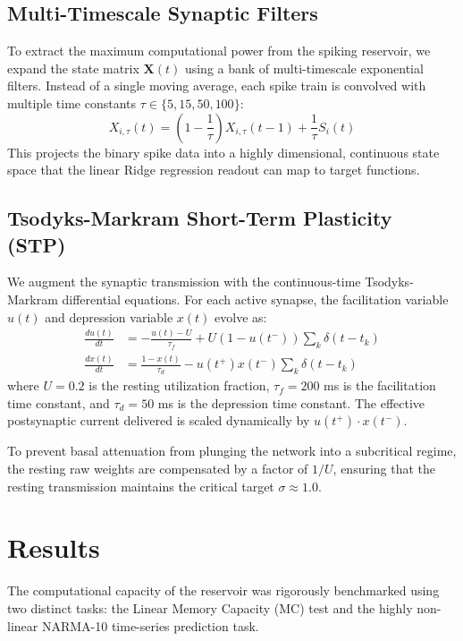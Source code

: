 \documentclass[12pt, a4paper]{article}
\begin{document}
\subsection{Multi-Timescale Synaptic Filters}
To extract the maximum computational power from the spiking reservoir, we expand the state matrix $\mathbf{X}(t)$ using a bank of multi-timescale exponential filters. Instead of a single moving average, each spike train is convolved with multiple time constants $\tau \in \{5, 15, 50, 100\}$:
\begin{equation}
X_{i,\tau}(t) = \left(1 - \frac{1}{\tau}\right) X_{i,\tau}(t-1) + \frac{1}{\tau} S_i(t)
\end{equation}
This projects the binary spike data into a highly dimensional, continuous state space that the linear Ridge regression readout can map to target functions.

\subsection{Tsodyks-Markram Short-Term Plasticity (STP)}
We augment the synaptic transmission with the continuous-time Tsodyks-Markram differential equations. For each active synapse, the facilitation variable $u(t)$ and depression variable $x(t)$ evolve as:
\begin{align}
\frac{du(t)}{dt} &= -\frac{u(t) - U}{\tau_f} + U(1 - u(t^-))\sum_{k} \delta(t - t_k) \\
\frac{dx(t)}{dt} &= \frac{1 - x(t)}{\tau_d} - u(t^+) x(t^-)\sum_{k} \delta(t - t_k)
\end{align}
where $U = 0.2$ is the resting utilization fraction, $\tau_f = 200$ ms is the facilitation time constant, and $\tau_d = 50$ ms is the depression time constant. The effective postsynaptic current delivered is scaled dynamically by $u(t^+) \cdot x(t^-)$.

To prevent basal attenuation from plunging the network into a subcritical regime, the resting raw weights are compensated by a factor of $1/U$, ensuring that the resting transmission maintains the critical target $\sigma \approx 1.0$.

\section{Results}

The computational capacity of the reservoir was rigorously benchmarked using two distinct tasks: the Linear Memory Capacity (MC) test and the highly non-linear NARMA-10 time-series prediction task.
\end{document}
